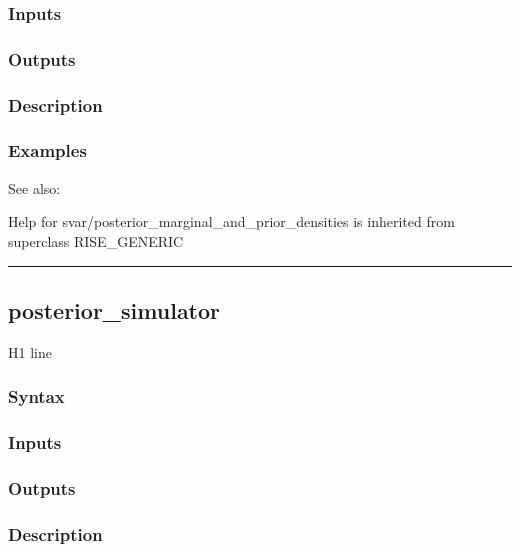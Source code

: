 \documentclass[letterpaper,10pt,english]{sphinxmanual}
\begin{document}
\subsubsection{Inputs}
\label{classes/models/@svar/svar:id74}

\subsubsection{Outputs}
\label{classes/models/@svar/svar:id75}

\subsubsection{Description}
\label{classes/models/@svar/svar:id76}

\subsubsection{Examples}
\label{classes/models/@svar/svar:id77}
See also:

Help for svar/posterior\_marginal\_and\_prior\_densities is inherited from superclass RISE\_GENERIC


\bigskip\hrule{}\bigskip



\subsection{posterior\_simulator}
\label{classes/models/@svar/svar:posterior-simulator}\label{classes/models/@svar/svar:id78}
H1 line


\subsubsection{Syntax}
\label{classes/models/@svar/svar:id79}

\subsubsection{Inputs}
\label{classes/models/@svar/svar:id80}

\subsubsection{Outputs}
\label{classes/models/@svar/svar:id81}

\subsubsection{Description}
\label{classes/models/@svar/svar:id82}
\end{document}
